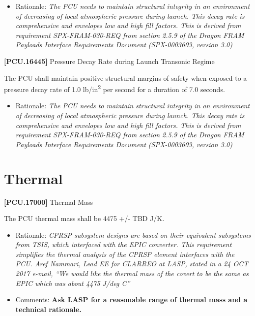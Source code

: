 \begin{itemize}
\item{} Rationale: \emph{The PCU needs to maintain structural integrity in an environment of decreasing of local atmospheric pressure during launch. This decay rate is comprehensive and envelopes low and high fill factors. This is derived from requirement SPX-FRAM-030-REQ from section 2.5.9 of the Dragon FRAM Payloads Interface Requirements Document (SPX-0003603, version 3.0)}

\end{itemize}

\textbf{[PCU.16445]} Pressure Decay Rate during Launch Transonic Regime

The \gls{PCU} shall maintain positive structural margins of safety when exposed to a pressure decay rate of 1.0 lb\slash in\textsuperscript{2} per second for a duration of 7.0 seconds.

\begin{itemize}
\item{} Rationale: \emph{The PCU needs to maintain structural integrity in an environment of decreasing of local atmospheric pressure during launch. This decay rate is comprehensive and envelopes low and high fill factors. This is derived from requirement SPX-FRAM-030-REQ from section 2.5.9 of the Dragon FRAM Payloads Interface Requirements Document (SPX-0003603, version 3.0)}

\end{itemize}

\section{Thermal}
\label{thermal}

\textbf{[PCU.17000]} Thermal Mass

The \gls{PCU} thermal mass shall be 4475 +\slash - TBD\label{tbx_14} J\slash K.

\begin{itemize}
\item{} Rationale: \emph{CPRSP subsystem designs are based on their equivalent subsystems from TSIS, which interfaced with the EPIC converter. This requirement simplifies the thermal analysis of the CPRSP element interfaces with the PCU. Aref Nammari, Lead EE for CLARREO at LASP, stated in a 24 OCT 2017 e-mail, ``We would like the thermal mass of the covert to be the same as EPIC which was about 4475 J\slash deg C''}

\item{} Comments: \textbf{Ask LASP for a reasonable range of thermal mass and a technical rationale.}

\end{itemize}

